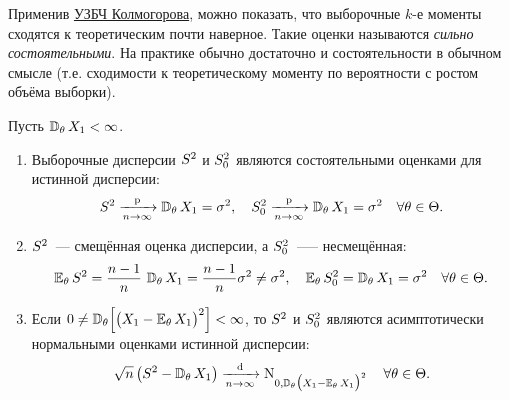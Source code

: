 \begin{rmrk}
    Применив \hyperlink{SLLN}{УЗБЧ Колмогорова}, можно показать, что выборочные $k$-е моменты сходятся к теоретическим почти наверное. 
    Такие оценки называются \textit{сильно состоятельными}. На практике обычно достаточно и состоятельности в обычном смысле (т.е. сходимости к теоретическому моменту по вероятности с ростом объёма выборки).
\end{rmrk}

\begin{thm*}
    Пусть $\operatorname{\mathbb{D}_{\theta}} X_{1}<\infty$.
    \begin{enumerate}
        \item Выборочные дисперсии $S^{2}$ и $S^{2}_0$ являются состоятельными оценками для истинной дисперсии:
            \begin{equation*}
                S^{2} \xrightarrow[n \to \infty]{\text{p}} \operatorname{\mathbb{D}_{\theta}} X_{1}=\sigma^{2}, \quad S_{0}^{2} \xrightarrow[n \to \infty]{\text{p}} \operatorname{\mathbb{D}_{\theta}} X_{1}=\sigma^{2} \quad \forall \theta \in \Theta.
            \end{equation*}
        \item $S^{2}$~--- смещённая оценка дисперсии, а $S^{2}_0$~--— несмещённая:
            \begin{equation*}
                \operatorname{\operatorname{\mathbb{E}}_{\theta}} S^{2}=\frac{n-1}{n} \, \operatorname{\mathbb{D}_{\theta}} X_{1}=\frac{n-1}{n} \sigma^{2} \neq \sigma^{2}, \quad \operatorname{\operatorname{\mathbb{E}}_{\theta}}  S_{0}^{2}=\operatorname{\mathbb{D}_{\theta}}  X_{1}=\sigma^{2} \quad \forall \theta \in \Theta.
            \end{equation*}
        \item Если $0 \neq \operatorname{\mathbb{D}_{\theta}} \Bigl[ \bigl(X_{1}-\operatorname{\operatorname{\mathbb{E}}_{\theta}} X_{1}\bigr)^{2} \Bigr] <\infty$, то $S^{2}$ и $S^{2}_0$ являются асимптотически нормальными оценками истинной дисперсии:
            \begin{equation*}
                \sqrt{n}\left(S^{2}-\operatorname{\mathbb{D}_{\theta}}  X_{1}\right) \xrightarrow[n \to \infty]{\text{d}} \operatorname{\mathrm{N}}_{0, \operatorname{\mathbb{D}_{\theta}} \bigl(X_{1}-\operatorname{\operatorname{\mathbb{E}}_{\theta}}  X_{1}\bigr)^{2}} \quad \forall \theta \in \Theta.
            \end{equation*}
    \end{enumerate}
\end{thm*}

